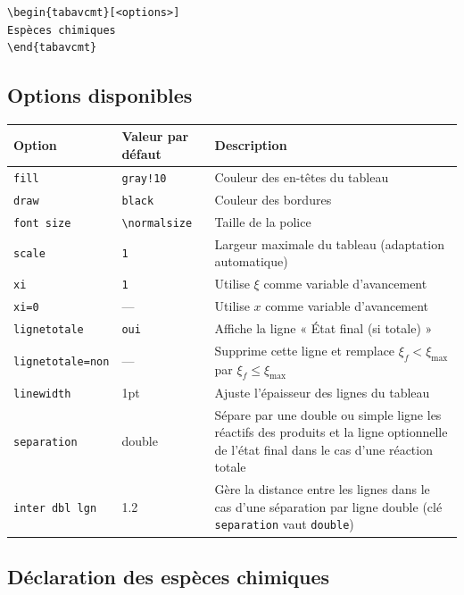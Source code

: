 \documentclass[a4paper,11pt]{article}
\begin{document}
\begin{verbatim}
\begin{tabavcmt}[<options>]
Espèces chimiques
\end{tabavcmt}
\end{verbatim}

\subsection{Options disponibles}

\begin{center}
\begin{tabular}{|l|l|p{8cm}|}
\hline
Option & Valeur par défaut & Description \\
\hline
\texttt{fill} & \texttt{gray!10} & Couleur des en-têtes du tableau \\
\hline
\texttt{draw} & \texttt{black} & Couleur des bordures \\
\hline
\texttt{font size} & \verb|\normalsize| & Taille de la police \\
\hline
\texttt{scale} & \texttt{1} & Largeur maximale du tableau (adaptation automatique) \\
\hline
\texttt{xi} & \texttt{1} & Utilise $\xi$ comme variable d'avancement \\
\hline
\texttt{xi=0} & --- & Utilise $x$ comme variable d'avancement \\
\hline
\texttt{lignetotale} & \texttt{oui} & Affiche la ligne « État final (si totale) » \\
\hline
\texttt{lignetotale=non} & --- & Supprime cette ligne et remplace $\xi_f < \xi_{\max}$ par $\xi_f \leq \xi_{\max}$ \\
\hline
\texttt{linewidth} & 1pt & Ajuste l'épaisseur des lignes du tableau \\
\hline
\texttt{separation} & double & Sépare par une double ou simple ligne les réactifs des produits et la ligne optionnelle de l'état final dans le cas d'une réaction totale \\
\hline
\texttt{inter dbl lgn} & 1.2 & Gère la distance entre les lignes dans le cas d'une séparation par ligne double (clé \texttt{separation} vaut \texttt{double}) \\
\hline
\end{tabular}
\end{center}

\subsection{Déclaration des espèces chimiques}
\end{document}

